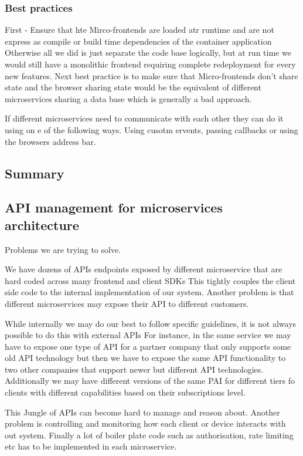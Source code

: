 \subsubsection{Best practices}
First - Ensure that hte Mirco-frontends are loaded atr runtime and are not express as compile or build time dependencies of the container application
Otherwise all we did is just separate the code base logically, but at run time we would still have a monolithic frontend requiring complete redeployment for every new features.
Next best practice is to make sure that Micro-frontends don't share state and the browser sharing state would be the equivalent of different microservices sharing a data base which is generally a bad approach.

If different microservices need to communicate with each other they can do it using on e of the following ways. Using cusotm ervents, passing callbacks or using the browsers address bar.

\subsection{Summary}

\subsection{API management for microservices architecture}
Problems we are trying to solve.

We have dozens of APIs endpoints exposed by different microservice that are hard coded across many frontend and client SDKs
This tightly couples the client side code to the internal implementation of our system.
Another problem is that different microservices may expose their API to different customers.

While internally we may do our best to follow specific guidelines, it is not always possible to do this with external APIs
For instance, in the same service we may have to expose one type of API for a partner company that only supports some old API technology but then we have to expose the same API functionality to two other companies that support newer but different API technologies.
Additionally we may have different versions of the same PAI for different tiers fo clients with different capabilities based on their subscriptions level.

This Jungle of APIs can become hard to manage and reason about.
Another problem is controlling and monitoring how each client or device interacts with out system.
Finally a lot of boiler plate code such as authorisation, rate limiting etc has to be implemented in each microservice.

